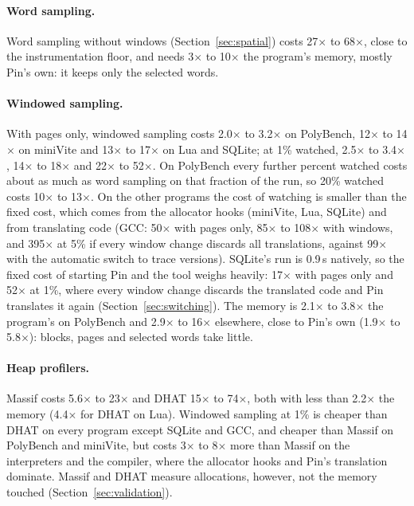 \documentclass[11pt]{article}
\newcommand{\secref}[1]{Section~\ref{#1}}
\begin{document}
\paragraph{Word sampling.} Word sampling without windows (\secref{sec:spatial}) costs 27$\times$ to 68$\times$, close to the instrumentation floor, and needs 3$\times$ to 10$\times$ the program's memory, mostly Pin's own: it keeps only the selected words.

\paragraph{Windowed sampling.} With pages only, windowed sampling costs 2.0$\times$ to 3.2$\times$ on PolyBench, 12$\times$ to 14$\times$ on miniVite and 13$\times$ to 17$\times$ on Lua and SQLite; at 1\% watched, 2.5$\times$ to 3.4$\times$, 14$\times$ to 18$\times$ and 22$\times$ to 52$\times$. On PolyBench every further percent watched costs about as much as word sampling on that fraction of the run, so 20\% watched costs 10$\times$ to 13$\times$. On the other programs the cost of watching is smaller than the fixed cost, which comes from the allocator hooks (miniVite, Lua, SQLite) and from translating code (GCC: 50$\times$ with pages only, 85$\times$ to 108$\times$ with windows, and 395$\times$ at 5\% if every window change discards all translations, against 99$\times$ with the automatic switch to trace versions). SQLite's run is 0.9\,s natively, so the fixed cost of starting Pin and the tool weighs heavily: 17$\times$ with pages only and 52$\times$ at 1\%, where every window change discards the translated code and Pin translates it again (\secref{sec:switching}). The memory is 2.1$\times$ to 3.8$\times$ the program's on PolyBench and 2.9$\times$ to 16$\times$ elsewhere, close to Pin's own (1.9$\times$ to 5.8$\times$): blocks, pages and selected words take little.

\paragraph{Heap profilers.} Massif costs 5.6$\times$ to 23$\times$ and DHAT 15$\times$ to 74$\times$, both with less than 2.2$\times$ the memory (4.4$\times$ for DHAT on Lua). Windowed sampling at 1\% is cheaper than DHAT on every program except SQLite and GCC, and cheaper than Massif on PolyBench and miniVite, but costs 3$\times$ to 8$\times$ more than Massif on the interpreters and the compiler, where the allocator hooks and Pin's translation dominate. Massif and DHAT measure allocations, however, not the memory touched (\secref{sec:validation}).
\end{document}
